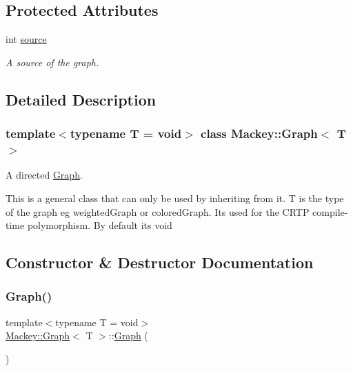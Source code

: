 \subsection*{Protected Attributes}
\begin{DoxyCompactItemize}
\item 
int \hyperlink{classMackey_1_1Graph_a43657a07a21a2dcf422876400360ed5b}{source}
\begin{DoxyCompactList}\small\item\em A source of the graph. \end{DoxyCompactList}\end{DoxyCompactItemize}


\subsection{Detailed Description}
\subsubsection*{template$<$typename T = void$>$\newline
class Mackey\+::\+Graph$<$ T $>$}

A directed \hyperlink{classMackey_1_1Graph}{Graph}. 

This is a general class that can only be used by inheriting from it. T is the type of the graph eg weighted\+Graph or colored\+Graph. It\textquotesingle{}s used for the C\+R\+TP compile-\/time polymorphism. By default it\textquotesingle{}s void 

\subsection{Constructor \& Destructor Documentation}
\mbox{\label{classMackey_1_1Graph_a910e6687de1a1a90df5b656e3c850a01}} 
\subsubsection{\texorpdfstring{Graph()}{Graph()}\hspace{0.1cm}{\footnotesize\ttfamily [1/2]}}
{\footnotesize\ttfamily template$<$typename T = void$>$ \\
\hyperlink{classMackey_1_1Graph}{Mackey\+::\+Graph}$<$ T $>$\+::\hyperlink{classMackey_1_1Graph}{Graph} (\begin{DoxyParamCaption}{ }\end{DoxyParamCaption})\hspace{0.3cm}{\ttfamily [inline]}}



